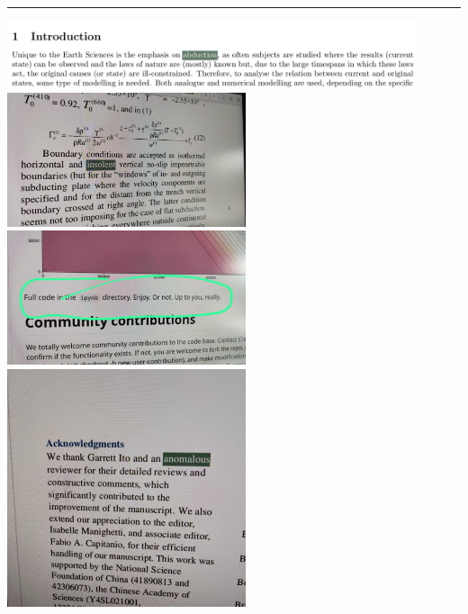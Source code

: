 \par\noindent\rule{\textwidth}{0.4pt}
\begin{center}
\includegraphics[width=12cm]{images/interesting/Untitled2}\\ 
\includegraphics[width=7cm]{images/interesting/Untitled1} 
\includegraphics[width=7cm]{images/interesting/Untitled3} \\
\includegraphics[width=7cm]{images/interesting/Untitled4} 
\end{center}




